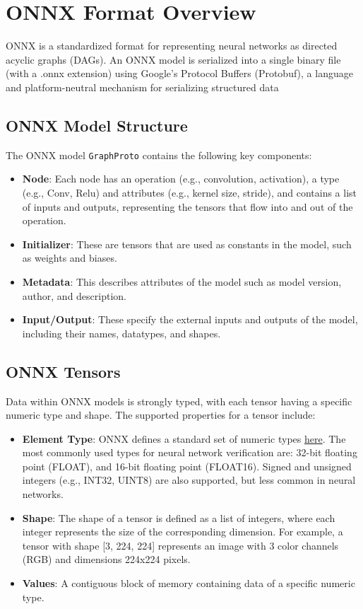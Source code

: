 \section{ONNX Format Overview}
\label{sec:onnx_overview}
ONNX is a standardized format for representing neural networks as directed acyclic graphs (DAGs). An ONNX model is serialized into a single binary file (with a .onnx extension) using Google's Protocol Buffers 
(Protobuf), a language and platform-neutral mechanism for serializing structured data

\subsection{ONNX Model Structure}
The ONNX model \texttt{GraphProto} contains the following key components:
\begin{itemize}
	\item \textbf{Node}: Each node has an operation (e.g., convolution, activation), a type (e.g., Conv, Relu) and attributes 
	(e.g., kernel size, stride), and contains a list of inputs and outputs, representing the tensors that flow into and out of the operation.
	\item \textbf{Initializer}: These are tensors that are used as constants in the model, such as weights and biases.
	\item \textbf{Metadata}: This describes attributes of the model such as model version, author, and description.
	\item \textbf{Input/Output}: These specify the external inputs and outputs of the model, including their names, datatypes, and shapes.
\end{itemize}

\subsection{ONNX Tensors}
Data within ONNX models is strongly typed, with each tensor having a specific numeric type and shape. The supported properties for a tensor include:
\begin{itemize}
	\item \textbf{Element Type}: ONNX defines a standard set of numeric types \href{https://onnx.ai/onnx/intro/concepts.html#element-type}{here}. 
	The most commonly used types for neural network verification are: 32-bit floating point (FLOAT), and 16-bit floating point (FLOAT16). Signed and unsigned integers (e.g., INT32, UINT8) are also supported, 
	but less common in neural networks.
	\item \textbf{Shape}: The shape of a tensor is defined as a list of integers, where each integer represents the size of the corresponding dimension. For example, a tensor with shape [3, 224, 224] 
	represents an image with 3 color channels (RGB) and dimensions 224x224 pixels.
	\item \textbf{Values}: A contiguous block of memory containing data of a specific numeric type.
\end{itemize}

